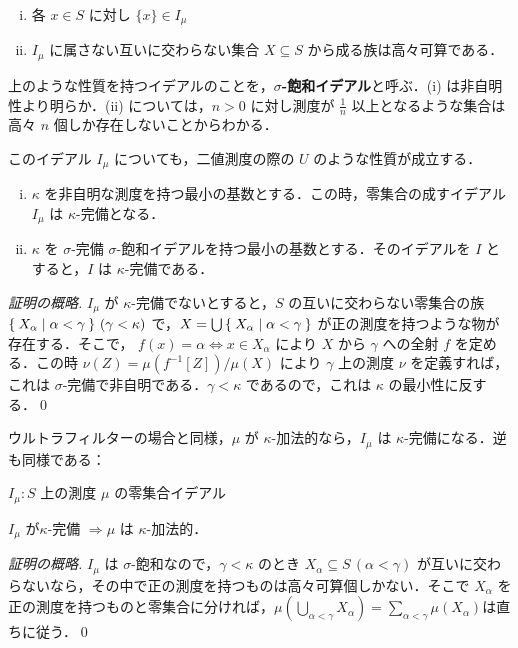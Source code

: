 \documentclass[a4j]{jsarticle}
\begin{document}
\begin{enumerate}[(i)]
 \item 各 $x \in S$ に対し $\{x\} \in I_\mu$
       \label{Def:saturate:non-principal}
 \item $I_\mu$ に属さない互いに交わらない集合 $X \subseteq S$ から成る族は高々可算である．
       \label{Def:saturate:disj}
\end{enumerate}

上のような性質を持つイデアルのことを，{\bfseries $\sigma$-飽和イデアル}と呼ぶ．(i) は非自明性より明らか．(ii) については，$n > 0$ に対し測度が $\frac{1}{n}$ 以上となるような集合は高々 $n$ 個しか存在しないことからわかる．

このイデアル $I_\mu$ についても，二値測度の際の $U$ のような性質が成立する．

\begin{lemma}
 \begin{enumerate}[(i)]
  \item $\kappa$ を非自明な測度を持つ最小の基数とする．この時，零集合の成すイデアル $I_\mu$ は $\kappa$-完備となる．
  \item $\kappa$ を $\sigma$-完備 $\sigma$-飽和イデアルを持つ最小の基数とする．そのイデアルを $I$ とすると，$I$ は $\kappa$-完備である．
 \end{enumerate}
\end{lemma}
\begin{proof}[証明の概略]
 $I_\mu$ が $\kappa$-完備でないとすると，$S$ の互いに交わらない零集合の族 $\Set{X_\alpha | \alpha < \gamma}\,(\gamma < \kappa)$ で，$X = \bigcup \Set{X_\alpha | \alpha < \gamma}$ が正の測度を持つような物が存在する．そこで，
 $f(x) = \alpha \Leftrightarrow x \in X_\alpha$
 により $X$ から $\gamma$ への全射 $f$ を定める．この時 $\nu(Z) = \mu(f^{-1}[Z])/\mu(X)$ により $\gamma$ 上の測度 $\nu$ を定義すれば，これは $\sigma$-完備で非自明である．$\gamma < \kappa$ であるので，これは $\kappa$ の最小性に反する．\qed
\end{proof}

ウルトラフィルターの場合と同様，$\mu$ が $\kappa$-加法的なら，$I_\mu$ は $\kappa$-完備になる．逆も同様である：

\begin{lemma}
 $I_\mu:S$ 上の測度 $\mu$ の零集合イデアル
 
 $I_\mu$ が$\kappa$-完備 $ \Rightarrow \mu$ は $\kappa$-加法的．
\end{lemma}
\begin{proof}[証明の概略]
 $I_\mu$ は $\sigma$-飽和なので，$\gamma < \kappa$ のとき $X_\alpha \subseteq S \, (\alpha < \gamma)$ が互いに交わらないなら，その中で正の測度を持つものは高々可算個しかない．そこで $X_\alpha$ を正の測度を持つものと零集合に分ければ，$\mu(\bigcup_{\alpha < \gamma} X_\alpha) = \sum_{\alpha < \gamma} \mu(X_\alpha)$は直ちに従う．\qed
\end{proof}
\end{document}
